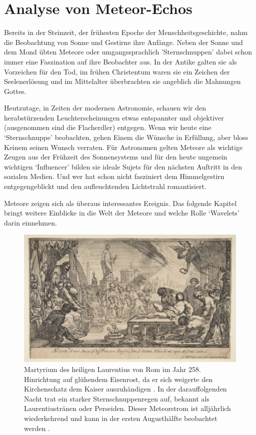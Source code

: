 %
%
%
\chapter{Analyse von Meteor-Echos\label{chapter:meteor}}
\begin{refsection}

{\parindent=0pt
Bereits} in der Steinzeit, der frühesten Epoche der Menschheitsgeschichte, nahm die Beobachtung von Sonne und Gestirne ihre Anfänge.
%
Neben der Sonne und dem Mond übten Meteore oder umgangssprachlich 'Sternschnuppen' dabei schon immer eine Faszination auf ihre Beobachter aus.
%
%
%
In der Antike galten sie als Vorzeichen für den Tod, im frühen Christentum waren sie ein Zeichen der Seelenerlösung und im Mittelalter überbrachten sie angeblich die Mahnungen Gottes.

Heutzutage, in Zeiten der modernen Astronomie, schauen wir den herabstürzenden Leuchterscheinungen etwas entspannter und objektiver (ausgenommen sind die Flacherdler) entgegen.
Wenn wir heute eine `Sternschnuppe' beobachten, gehen Einem die Wünsche in Erfüllung, aber bloss Keinem seinen Wunsch verraten.
Für Astronomen gelten Meteore als wichtige Zeugen aus der Frühzeit des Sonnensystems und für den heute ungemein wichtigen `Influencer' bilden sie ideale Sujets für den nächsten Auftritt in den sozialen Medien.
Und wer hat schon nicht fasziniert dem Himmelgestirn entgegengeblickt und den aufleuchtenden Lichtstrahl romantisiert.

Meteore zeigen sich als überaus interessantes Ereignis.
Das folgende Kapitel bringt weitere Einblicke in die Welt der Meteore und welche Rolle `Wavelets' darin einnehmen.
\begin{figure}
	\centering
	\includegraphics[width=0.9\linewidth]{papers/meteor/images/claudeVignonMartyriumDesHeiligenLaurentius}
	\caption{Martyrium des heiligen Laurentius von Rom im Jahr 258. 
		Hinrichtung auf glühendem Eisenrost, da er sich weigerte den Kirchenschatz dem Kaiser auszuhändigen \cite{buch:joeckle}.
		In der darauffolgenden Nacht trat ein starker Sternschnuppenregen auf, bekannt als Laurentiustränen oder Perseiden. 
%
		Dieser Meteorstrom ist alljährlich wiederkehrend und kann in der ersten Augusthälfte beobachtet werden \cite{gemaelde:vignon}.}
	\label{fig:claudevignonmartyriumdesheiligenlaurentius}
\end{figure}


\end{refsection}
